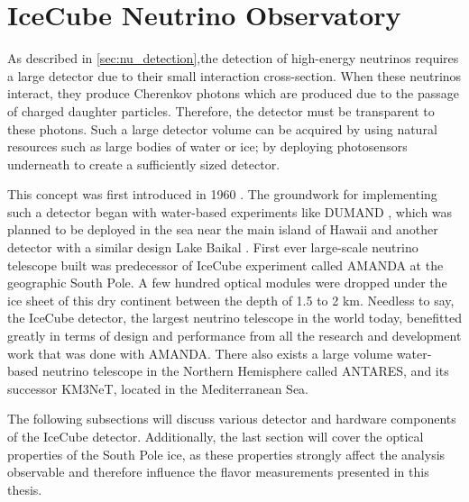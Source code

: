 \section{IceCube Neutrino Observatory}
\label{IC_detector}
As described in \ref{sec:nu_detection},the detection of high-energy neutrinos requires a large detector due to their small interaction cross-section. When these neutrinos interact, they produce Cherenkov photons which are produced due to the passage of charged daughter particles. Therefore, the detector must be transparent to these photons. Such a large detector volume can be acquired by using natural resources such as large bodies of water or ice; by deploying photosensors underneath to create a sufficiently sized detector.\par
This concept was first introduced in 1960 . The groundwork for implementing such a detector began with water-based experiments like DUMAND , which was planned to be deployed in the sea near the main island of Hawaii and another detector with a similar design Lake Baikal . First ever large-scale neutrino telescope built was predecessor of IceCube experiment called AMANDA  at the geographic South Pole. A few hundred optical modules were dropped under the ice sheet of this dry continent between the depth of 1.5 to 2 km. Needless to say, the IceCube detector, the largest neutrino telescope in the world today, benefitted greatly in terms of design and performance from all the research and development work that was done with AMANDA. 
There also exists a large volume water-based neutrino telescope in the Northern Hemisphere called ANTARES, and its successor KM3NeT, located in the Mediterranean Sea.\par
The following subsections will discuss various detector and hardware components of the IceCube detector. Additionally, the last section will cover the optical properties of the South Pole ice, as these properties strongly affect the analysis observable and therefore influence the flavor measurements presented in this thesis.\par

